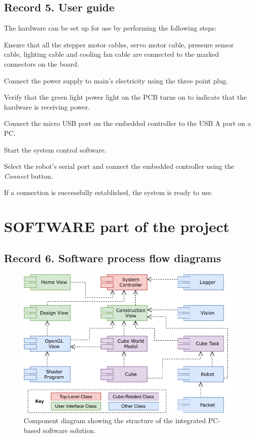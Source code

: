 \newpage

\subsection{Record 5. User guide}

The hardware can be set up for use by performing the following steps:

\begin{compactenum}
	\item Ensure that all the stepper motor cables, servo motor cable, pressure sensor cable, lighting cable and cooling fan cable are connected to the marked connectors on the board.
	\item Connect the power supply to main's electricity using the three point plug.
	\item Verify that the green light power light on the PCB turns on to indicate that the hardware is receiving power.
	\item Connect the micro USB port on the embedded controller to the USB A port on a PC.
	\item Start the system control software.
	\item Select the robot's serial port and connect the embedded controller using the \textit{Connect} button.
	\item If a connection is successfully established, the system is ready to use.
\end{compactenum}

\newpage


\section{SOFTWARE part of the project}

\subsection{Record 6. Software process flow diagrams}

\begin{figure}[!ht]
	\centering
	\includegraphics[scale=1]{figures/component-diagram.pdf}
	\caption{Component diagram showing the structure of the integrated PC-based software solution.}
	\label{fig:component-diagram-techdoc}
\end{figure}

